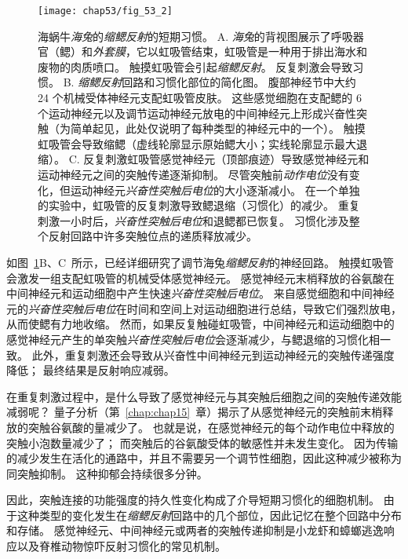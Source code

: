 \begin{figure}[htbp]
	\centering
	\texttt{[image: chap53/fig\_53\_2]}
	\caption{海蜗牛\textit{海兔}的\textit{缩鳃反射}的短期习惯。
		A. \textit{海兔}的背视图展示了呼吸器官（鳃）和\textit{外套膜}，它以虹吸管结束，虹吸管是一种用于排出海水和废物的肉质喷口。
		触摸虹吸管会引起\textit{缩鳃反射}。
		反复刺激会导致习惯。
		B. \textit{缩鳃反射}回路和习惯化部位的简化图。
		腹部神经节中大约 24 个机械受体神经元支配虹吸管皮肤。
		这些感觉细胞在支配鳃的 6 个运动神经元以及调节运动神经元放电的中间神经元上形成兴奋性突触（为简单起见，此处仅说明了每种类型的神经元中的一个）。
		触摸虹吸管会导致缩鳃（虚线轮廓显示原始鳃大小；实线轮廓显示最大退缩）。
		C. 反复刺激虹吸管感觉神经元（顶部痕迹）导致感觉神经元和运动神经元之间的突触传递逐渐抑制。
		尽管突触前\textit{动作电位}没有变化，但运动神经元\textit{兴奋性突触后电位}的大小逐渐减小。
		在一个单独的实验中，虹吸管的反复刺激导致鳃退缩（习惯化）的减少。
		重复刺激一小时后，\textit{兴奋性突触后电位}和退鳃都已恢复。
		习惯化涉及整个反射回路中许多突触位点的递质释放减少\cite{pinsker1970habituation}。}
	\label{fig:53_2}
\end{figure}


如图~\ref{fig:53_2}B、C~所示，已经详细研究了调节海兔\textit{缩鳃反射}的神经回路。
触摸虹吸管会激发一组支配虹吸管的机械受体感觉神经元。
感觉神经元末梢释放的谷氨酸在中间神经元和运动细胞中产生快速\textit{兴奋性突触后电位}。
来自感觉细胞和中间神经元的\textit{兴奋性突触后电位}在时间和空间上对运动细胞进行总结，导致它们强烈放电，从而使鳃有力地收缩。
然而，如果反复触碰虹吸管，中间神经元和运动细胞中的感觉神经元产生的单突触\textit{兴奋性突触后电位}会逐渐减少，与鳃退缩的习惯化相一致。
此外，重复刺激还会导致从兴奋性中间神经元到运动神经元的突触传递强度降低；
最终结果是反射响应减弱。


在重复刺激过程中，是什么导致了感觉神经元与其突触后细胞之间的突触传递效能减弱呢？
量子分析（第~\ref{chap:chap15}~章）揭示了从感觉神经元的突触前末梢释放的突触谷氨酸的量减少了。
也就是说，在感觉神经元的每个动作电位中释放的突触小泡数量减少了；
而突触后的谷氨酸受体的敏感性并未发生变化。
因为传输的减少发生在活化的通路中，并且不需要另一个调节性细胞，因此这种减少被称为同突触抑制。
这种抑郁会持续很多分钟。


因此，突触连接的功能强度的持久性变化构成了介导短期习惯化的细胞机制。
由于这种类型的变化发生在\textit{缩鳃反射}回路中的几个部位，因此记忆在整个回路中分布和存储。
感觉神经元、中间神经元或两者的突触传递抑制是小龙虾和蟑螂逃逸响应以及脊椎动物惊吓反射习惯化的常见机制。


